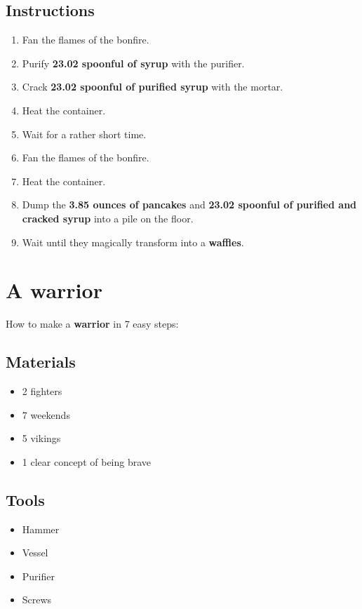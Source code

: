 \documentclass{article}
\begin{document}
\subsection{Instructions}\begin{enumerate}
\item 
Fan the flames of the bonfire.
\item 
Purify \textbf{23.02 spoonful of syrup} with the purifier.
\item 
Crack \textbf{23.02 spoonful of purified syrup} with the mortar.
\item 
Heat the container.
\item 
Wait for a rather short time.
\item 
Fan the flames of the bonfire.
\item 
Heat the container.
\item 
Dump the \textbf{3.85 ounces of pancakes} and \textbf{23.02 spoonful of purified and cracked syrup} into a pile on the floor.
\item 
Wait until they magically transform into a \textbf{waffles}.
\end{enumerate}
\newpage
\section{A warrior}How to make a \textbf{warrior} in 7 easy steps:

\subsection{Materials}\begin{itemize}
\item 
2 fighters
\item 
7 weekends
\item 
5 vikings
\item 
1 clear concept of being brave
\end{itemize}
\subsection{Tools}\begin{itemize}
\item 
Hammer
\item 
Vessel
\item 
Purifier
\item 
Screws
\end{itemize}
\end{document}
